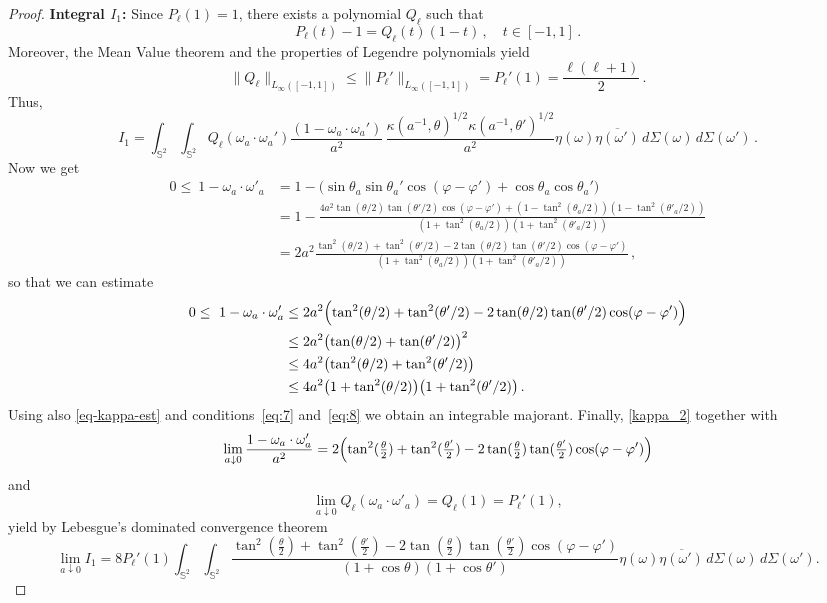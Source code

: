 \documentclass[a4paper,11pt,DIV=11,%
abstract=on%
]{scrartcl}
\newcommand{\red}[1]{#1}
\begin{document}
\begin{proof}
	\textbf{Integral $I_1$:} 
		Since $P_\ell(1) = 1$, there exists a polynomial $Q_\ell$ such that 
	\begin{equation} \label{def:q-ell}
		P_\ell(t) -1= Q_{\ell}(t) (1-t)\,,\quad t\in [-1,1]\,.
	\end{equation}
	Moreover, the Mean Value theorem \red{and the properties of
          Legendre polynomials} yield
	$$
	\|\red{Q_\ell}\|_{L_\infty([-1,1])}  \leq \|P_\ell'\|_{L_\infty([-1,1])}
	= P_\ell'(1) =\frac{\ell(\ell+1)}{2}\,.
	$$
	Thus,
        \begin{equation}
	I_1 = \int_{\mathbb S^2}\int_{\mathbb S^2}Q_{\ell} (\omega_a\cdot \omega_a')  \frac{ (1-\omega_a\cdot \omega_a') }{a^2}\,
		\frac{\kappa(a^{-1},\theta)^{1/2}\kappa(a^{-1},\theta')^{1/2}}{a^2}
		\eta(\omega)
                \overline{\eta(\omega')}\,d\Sigma(\omega)\,d\Sigma(\omega')\,.\label{eq:13}       \end{equation}
	Now we get
	\begin{align*}
	\red{0\leq}\ 1-\omega_a \cdot \omega'_a
		&=1-\bigl(\sin\theta_a\sin\theta_a'\cos(\varphi-\varphi')+\cos\theta_a\cos\theta_a'\bigr)\\
		&=1-\frac{4a^2\tan(\theta/2)\tan(\theta'/2)\cos(\varphi-\varphi')
			+(1-\tan^2(\theta_a/2))(1-\tan^2(\theta'_a/2))}
		{(1+\tan^2(\theta_a/2))(1+\tan^2(\theta'_a/2))}\\
		&=2a^2\frac{\tan^2(\theta/2)+\tan^2(\theta'/2)
			-2\tan(\theta/2)\tan(\theta'/2)\cos(\varphi-\varphi')}
		{(1+\tan^2(\theta_a/2))(1+\tan^2(\theta'_a/2))}\,,
	\end{align*}
	so that we can estimate
	\begin{align}
	\red{0\leq}\	1-\omega_a \cdot \omega'_a
		&\leq 2a^2\Bigl(\tan^2(\theta/2)+\tan^2(\theta'/2)
		-2\tan(\theta/2)\tan(\theta'/2)\cos(\varphi-\varphi')\Bigr)\nonumber\\
		&\leq 2a^2\bigl(\tan(\theta/2)+\tan(\theta'/2)\bigr)^2 \nonumber\\
		&\leq 4a^2\bigl(\tan^2(\theta/2)+\tan^2(\theta'/2)\bigr) \nonumber\\
		&\leq
           4a^2\bigl(1+\tan^2(\theta/2)\bigr)\bigl(1+\tan^2(\theta'/2)\bigr)\,.\label{eq:15}
	\end{align}
	Using also \eqref{eq-kappa-est} and
        \red{conditions~\eqref{eq:7} and~\eqref{eq:8}} we obtain an integrable
	majorant. 
	Finally, \eqref{kappa_2}
	together with
	$$
	\lim_{a\downarrow 0}\frac{1-\omega_a\cdot \omega'_a}{a^2}
	=2\Bigl(\tan^2(\tfrac{\theta}{2})+\tan^2(\tfrac{\theta'}{2})
	-2\tan(\tfrac{\theta}{2})\tan(\tfrac{\theta'}{2})\cos(\varphi-\varphi')\Bigr)
	$$
	and
	$$\lim_{a\downarrow 0}Q_\ell(\omega_a \cdot \omega'_a) = Q_\ell(1) = P_\ell'(1),$$
	yield by Lebesgue's dominated convergence theorem 
	$$\lim_{a\downarrow 0}I_1
	=8P_\ell'(1)\int_{\mathbb S^2}\int_{\mathbb S^2}
	\frac{\tan^2(\tfrac{\theta}{2})+\tan^2(\tfrac{\theta'}{2})
		-2\tan(\tfrac{\theta}{2})\tan(\tfrac{\theta'}{2})\cos(\varphi-\varphi')}
	{(1+\cos\theta)(1+\cos\theta')}\eta(\omega)\overline{\eta(\omega')}\,d\Sigma(\omega)\,d\Sigma(\omega').$$
	

\end{proof}
\end{document}
